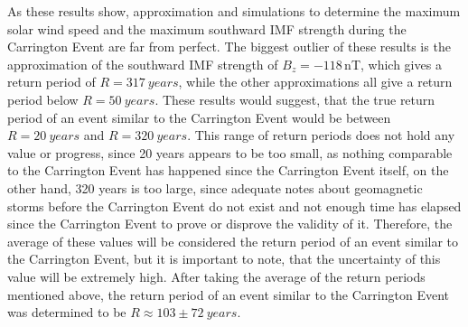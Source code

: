 \documentclass[12pt]{article}
\begin{document}
        As these results show, approximation and simulations to determine the maximum solar wind speed and the maximum southward IMF strength during the Carrington Event are far from perfect. The biggest outlier of these results is the approximation of the southward IMF strength of $B_z=-118\,$nT, which gives a return period of $R=317\ years$, while the other approximations all give a return period below $R=50\ years$. These results would suggest, that the true return period of an event similar to the Carrington Event would be between $R=20\ years$ and $R=320\ years$. This range of return periods does not hold any value or progress, since 20 years appears to be too small, as nothing comparable to the Carrington Event has happened since the Carrington Event itself, on the other hand, 320 years is too large, since adequate notes about geomagnetic storms before the Carrington Event do not exist and not enough time has elapsed since the Carrington Event to prove or disprove the validity of it. Therefore, the average of these values will be considered the return period of an event similar to the Carrington Event, but it is important to note, that the uncertainty of this value will be extremely high. After taking the average of the return periods mentioned above, the return period of an event similar to the Carrington Event was determined to be $R\approx 103\pm 72\ years$.
\end{document}
